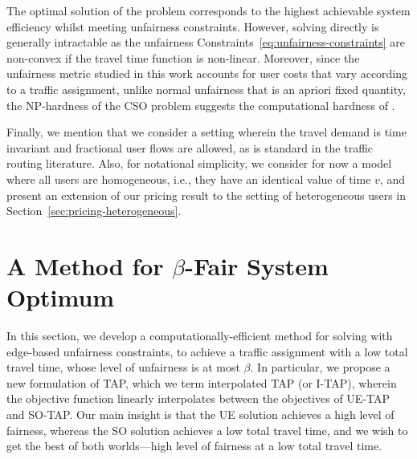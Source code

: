 \documentclass{article}
\newif\ifarxiv   %
\begin{document}
The optimal solution of the \fso problem corresponds to the highest achievable system efficiency whilst meeting unfairness constraints. However, solving \fso directly is generally intractable as the unfairness Constraints~\eqref{eq:unfairness-constraints} are non-convex if the travel time function is non-linear. Moreover, since the unfairness metric studied in this work accounts for user costs that vary according to a traffic assignment, unlike normal unfairness that is an apriori fixed quantity, the NP-hardness of the CSO problem \cite{so-routing-seminal} suggests the computational hardness of \fso \cite{basu2017reconciling,ANGELELLI2020105016}.

Finally, we mention that we consider a setting wherein the travel demand is time invariant and fractional user flows are allowed, as is standard in the traffic routing literature. Also, for notational simplicity, we consider for now a model where all users are homogeneous, i.e., they have an identical value of time $v$, and present an extension of our pricing result to the setting of heterogeneous users in Section~\ref{sec:pricing-heterogeneous}. %


\section{A Method for $\beta$-Fair System Optimum} \label{sec:itap-main}
In this section, we develop a computationally-efficient method for solving \fso with edge-based unfairness constraints, to achieve a traffic assignment with a low total travel time, whose level of unfairness is at most $\beta$. In particular, we propose a new formulation of TAP, which we term interpolated TAP (or I-TAP), wherein the objective function linearly interpolates between the objectives of UE-TAP and SO-TAP. Our main insight is that the UE solution achieves a high level of fairness, whereas the SO solution achieves a low total travel time, and we wish to get the best of both worlds---high level of fairness at a low total travel time. 
\end{document}
